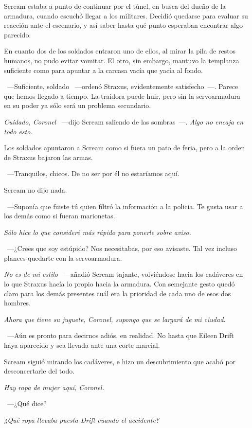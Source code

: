 Scream estaba a punto de continuar por el túnel, en busca del dueño de la armadura, cuando escuchó llegar a los militares. Decidió quedarse para evaluar su reacción ante el escenario, y así saber hasta qué punto esperaban encontrar algo parecido.

En cuanto dos de los soldados entraron uno de ellos, al mirar la pila de restos humanos, no pudo evitar vomitar. El otro, sin embargo, mantuvo la templanza suficiente como para apuntar a la carcasa vacía que yacía al fondo.

~---Suficiente, soldado ~---ordenó Straxus, evidentemente satisfecho~---. Parece que hemos llegado a tiempo. La traidora puede huir, pero sin la servoarmadura en su poder ya sólo será un problema secundario.

\emph{Cuidado, Coronel} ~---dijo Scream saliendo de las sombras~---. \emph{Algo no encaja en todo esto.}

Los soldados apuntaron a Scream como si fuera un pato de feria, pero a la orden de Straxus bajaron las armas.

~---Tranquilos, chicos. De no ser por él no estaríamos aquí.

Scream no dijo nada.

~---Suponía que fuiste tú quien filtró la información a la policía. Te gusta usar a los demás como si fueran marionetas.

\emph{Sólo hice lo que consideré más rápido para ponerle sobre aviso.}

~---¿Crees que soy estúpido? Nos necesitabas, por eso avisaste. Tal vez incluso planees quedarte con la servoarmadura.

\emph{No es de mi estilo} ~---añadió Scream tajante, volviéndose hacia los cadáveres en lo que Straxus hacía lo propio hacia la armadura. Con semejante gesto quedó claro para los demás presentes cuál era la prioridad de cada uno de esos dos hombres.

\emph{Ahora que tiene su juguete, Coronel, supongo que se largará de mi ciudad.}

~---Aún es pronto para decirnos adiós, en realidad. No hasta que Eileen Drift haya aparecido y sea llevada ante una corte marcial.

Scream siguió mirando los cadáveres, e hizo un descubrimiento que acabó por desconcertarle del todo.

\emph{Hay ropa de mujer aquí, Coronel.}

~---¿Qué dice?

\emph{¿Qué ropa llevaba puesta Drift cuando el accidente?}

